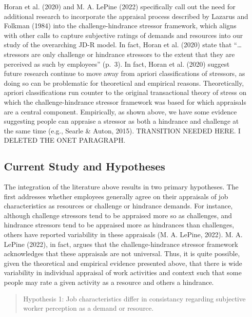 \documentclass[
  english,
  man]{apa6}
\begin{document}
Horan et al. (2020) and M. A. LePine (2022) specifically call out the need for additional research to incorporate the appraisal process described by Lazarus and Folkman (1984) into the challenge-hindrance stressor framework, which aligns with other calls to capture subjective ratings of demands and resources into our study of the overarching JD-R model. In fact, Horan et al. (2020) state that ``\ldots stressors are only challenge or hindrance stressors to the extent that they are perceived as such by employees'' (p.~3). In fact, Horan et al. (2020) suggest future research continue to move away from apriori classifications of stressors, as doing so can be problematic for theoretical and empirical reasons. Theoretically, apriori classifications run counter to the original transactional theory of stress on which the challenge-hindrance stressor framework was based for which appraisals are a central component. Empirically, as shown above, we have some evidence suggesting people can appraise a stressor as both a hindrance and challenge at the same time (e.g., Searle \& Auton, 2015). TRANSITION NEEDED HERE. I DELETED THE ONET PARAGRAPH.

\hypertarget{current-study-and-hypotheses}{%
\subsection{Current Study and Hypotheses}\label{current-study-and-hypotheses}}

The integration of the literature above results in two primary hypotheses. The first addresses whether employees generally agree on their appraisals of job characteristics as resources or challenge or hindrance demands. For instance, although challenge stressors tend to be appraised more so as challenges, and hindrance stressors tend to be appraised more as hindrances than challenges, others have reported variability in these appraisals (M. A. LePine, 2022). M. A. LePine (2022), in fact, argues that the challenge-hindrance stressor framework acknowledges that these appraisals are not universal. Thus, it is quite possible, given the theoretical and empirical evidence presented above, that there is wide variability in individual appraisal of work activities and context such that some people may rate a given activity as a resource and others a hindrance.

\begin{quote}
Hypothesis 1: Job characteristics differ in consistancy regarding subjective worker perception as a demand or resource.
\end{quote}
\end{document}
